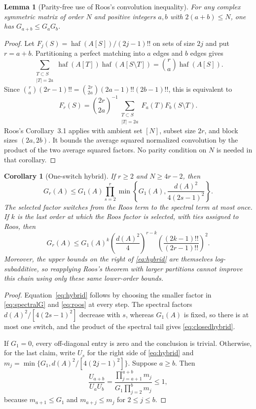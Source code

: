 \documentclass[11pt]{article}
\newtheorem{lemma}[theorem]{Lemma}
\newtheorem{corollary}[theorem]{Corollary}
\theoremstyle{remark}\newtheorem{remark}[theorem]{Remark}
\DeclareMathOperator{\haf}{haf}\DeclareMathOperator{\tr}{tr}
\begin{document}
\begin{lemma}[Parity-free use of Roos's convolution inequality]\label{lem:roosparity}
For any complex symmetric matrix of order $N$ and positive integers $a,b$
with $2(a+b)\le N$, one has $G_{a+b}\le G_aG_b$.
\end{lemma}
\begin{proof}
Let $F_j(S)=\haf(A[S])/(2j-1)!!$ on sets of size $2j$ and put $r=a+b$.
Partitioning a perfect matching into $a$ edges and $b$ edges gives
\[
\sum_{\substack{T\subset S\\|T|=2a}}
\haf(A[T])\haf(A[S\setminus T])=\binom ra\haf(A[S]).
\]
Since
$\binom ra(2r-1)!!=\binom{2r}{2a}(2a-1)!!(2b-1)!!$, this is equivalent to
\[
F_r(S)=\binom{2r}{2a}^{-1}
\sum_{\substack{T\subset S\\|T|=2a}}F_a(T)F_b(S\setminus T).
\]
Roos's Corollary~3.1 applies with ambient set $[N]$, subset size $2r$,
and block sizes $(2a,2b)$. It bounds the average squared normalized
convolution by the product of the two average squared factors. No parity
condition on $N$ is needed in that corollary.
\end{proof}

\begin{corollary}[One-switch hybrid]\label{cor:hybrid}
If $r\ge2$ and $N\ge4r-2$, then
\begin{equation}\label{eq:hybrid}
\boxed{
G_r(A)\le G_1(A)\prod_{s=2}^r
\min\left\{G_1(A),\frac{d(A)^2}{4(2s-1)^2}\right\}.
}
\end{equation}
The selected factor switches from the Roos term to the spectral term at most
once.  If $k$ is the last order at which the Roos factor is selected, with
ties assigned to Roos, then
\begin{equation}\label{eq:closedhybrid}
\boxed{
G_r(A)\le G_1(A)^k
\left(\frac{d(A)^2}{4}\right)^{r-k}
\left(\frac{(2k-1)!!}{(2r-1)!!}\right)^2.
}
\end{equation}
Moreover, the upper bounds on the right of \eqref{eq:hybrid} are themselves
log-subadditive, so reapplying Roos's theorem with larger partitions cannot
improve this chain using only these same lower-order bounds.
\end{corollary}
\begin{proof}
Equation~\eqref{eq:hybrid} follows by choosing the smaller factor in
\eqref{eq:spectralG} and \eqref{eq:roos} at every step.  The spectral factors
$d(A)^2/[4(2s-1)^2]$ decrease with $s$, whereas $G_1(A)$ is fixed, so there is
at most one switch, and the product of the spectral tail gives
\eqref{eq:closedhybrid}.

If $G_1=0$, every off-diagonal entry is zero and the conclusion is trivial.
Otherwise, for the last claim, write $U_s$ for the right side of \eqref{eq:hybrid} and
$m_j=\min\{G_1,d(A)^2/[4(2j-1)^2]\}$.  Suppose $a\ge b$.  Then
\[
\frac{U_{a+b}}{U_aU_b}
=\frac{\prod_{j=a+1}^{a+b}m_j}
{G_1\prod_{j=2}^{b}m_j}\le1,
\]
because $m_{a+1}\le G_1$ and $m_{a+j}\le m_j$ for $2\le j\le b$.
\end{proof}
\end{document}
